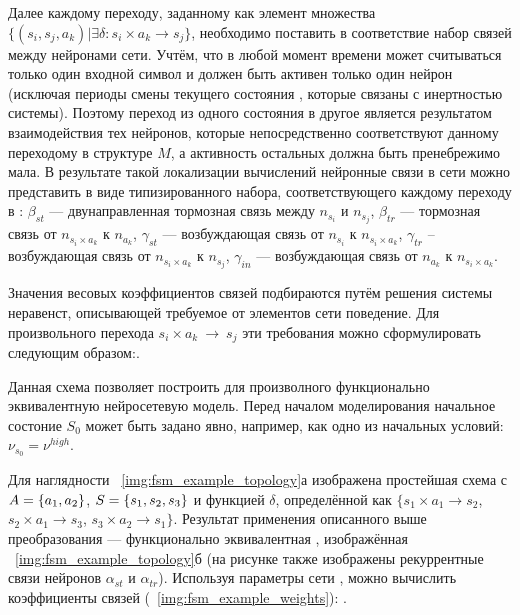 Далее каждому переходу, заданному как элемент множества $\{ \left( s_{i}, s_{j}, a_{k} \right) | \exists \delta\!: s_{i}\!\times\!a_{k} \to s_{j} \}$, необходимо поставить в соответствие набор связей между нейронами сети. Учтём, что в любой момент времени может считываться только один входной символ и должен быть активен только один нейрон  (исключая периоды смены текущего состояния , которые связаны с инертностью системы). Поэтому переход из одного состояния в другое является результатом взаимодействия тех нейронов, которые непосредственно соответствуют данному переходому в структуре $M$, а активность остальных должна быть пренебрежимо мала. В результате такой локализации вычислений нейронные связи в сети можно представить в виде типизированного набора, соответствующего каждому переходу в : $\beta_{st}$ --- двунаправленная тормозная связь между $n_{s_{i}}$ и $n_{s_{j}}$, $\beta_{tr}$ --- тормозная связь от $n_{s_{i}\!\times\!a_{k}}$ к $n_{a_{k}}$, $\gamma_{st}$ --- возбуждающая связь от $n_{s_{i}}$ к $n_{s_{i}\!\times\!a_{k}}$, $\gamma_{tr}$ -- возбуждающая связь от $n_{s_{i}\!\times\!a_{k}}$ к $n_{s_{j}}$, $\gamma_{in}$ --- возбуждающая связь от $n_{a_{k}}$ к $n_{s_{i}\!\times\!a_{k}}$. 

Значения весовых коэффициентов связей подбираются путём решения системы неравенст, описывающей требуемое от элементов сети поведение. Для произвольного перехода $s_{i}\!\times\!a_{k}~\to~s_{j}$ эти требования можно сформулировать следующим образом:. 

Данная схема позволяет построить для произволного  функционально эквивалентную нейросетевую модель. Перед началом моделирования начальное состоние $S_{0}$ может быть задано явно, например, как одно из начальных условий: $\nu_{s_{0}} = \nu^{high}$.

Для наглядности \onfigure~\ref{img:fsm_example_topology}а изображена простейшая схема  с $A = \{ a_{1}, a_{2} \}$, $S = \{ s_{1}, s_{2}, s_{3} \}$ и функцией $\delta$, определённой как $\{ s_{1}\!\times\!a_{1} \to s_{2}$, $s_{2}\!\times\!a_{1} \to s_{3}$, $s_{3}\!\times\!a_{2} \to s_{1} \}$. Результат применения описанного выше преобразования --- функционально эквивалентная , изображённая \onfigure~\ref{img:fsm_example_topology}б (на рисунке также изображены рекуррентные связи нейронов $\alpha_{st}$ и $\alpha_{tr}$). Используя параметры сети , можно вычислить коэффициенты связей (\seefigure~\ref{img:fsm_example_weights}): .

